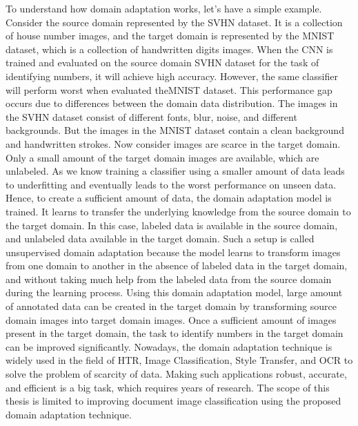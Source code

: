 To understand how domain adaptation works, let's have a simple example. Consider the source domain represented by the \ac{SVHN} dataset. It is a collection of house number images, and the target domain is represented by the \ac{MNIST} dataset, which is a collection of handwritten digits images. When the \ac{CNN} is trained and evaluated on the source domain \ac{SVHN} dataset for the task of identifying numbers, it will achieve high accuracy. However, the same classifier will perform worst when evaluated the\ac{MNIST} dataset. This performance gap occurs due to differences between the domain data distribution. The images in the \ac{SVHN} dataset consist of different fonts, blur, noise, and different backgrounds. But the images in the \ac{MNIST} dataset contain a clean background and handwritten strokes. Now consider images are scarce in the target domain. Only a small amount of the target domain images are available, which are unlabeled. As we know training a classifier using a smaller amount of data leads to underfitting and eventually leads to the worst performance on unseen data. Hence, to create a sufficient amount of data, the domain adaptation model is trained. It learns to transfer the underlying knowledge from the source domain to the target domain. In this case, labeled data is available in the source domain, and unlabeled data available in the target domain. Such a setup is called unsupervised domain adaptation because the model learns to transform images from one domain to another in the absence of labeled data in the target domain, and without taking much help from the labeled data from the source domain during the learning process. Using this domain adaptation model, large amount of annotated data can be created in the target domain by transforming source domain images into target domain images. Once a sufficient amount of images present in the target domain, the task to identify numbers in the target domain can be improved significantly. Nowadays, the domain adaptation technique is widely used in the field of \ac{HTR}\cite{Kang_2020}, Image Classification\cite{5288526}, Style Transfer\cite{johnson2016perceptual}, and \ac{OCR}\cite{8978011} to solve the problem of scarcity of data. Making such applications robust, accurate, and efficient is a big task, which requires years of research. The scope of this thesis is limited to improving document image classification using the proposed domain adaptation technique.

